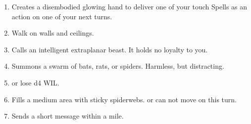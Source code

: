 \documentclass[itdr]{subfiles}
\begin{document}
\begin{enumerate}
	\item {} Creates a disembodied glowing hand to deliver one of your touch Spells as an action on one of your next turns.
	\item {} Walk on walls and ceilings.
	\item {} Calls an intelligent extraplanar beast. It holds no loyalty to you.
	\item {} Summons a swarm of bats, rats, or spiders. Harmless, but distracting.
	\item {}  or lose d4 WIL.
	\item {} Fills a medium area with sticky spiderwebs.  or can not move on this turn.
	\item {} Sends a short message within a mile.
\end{enumerate}

\vfill
\break
\end{document}
